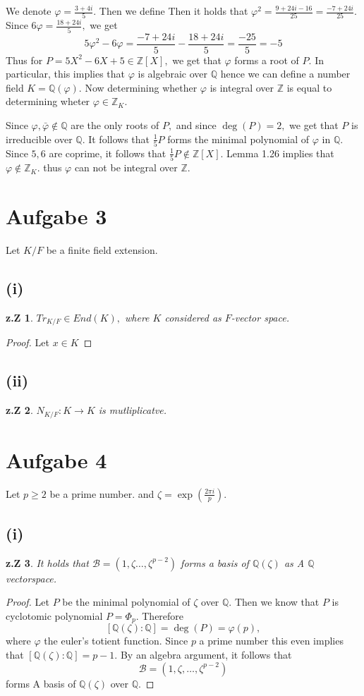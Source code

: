 \documentclass[10pt,a4paper]{article}
\newtheorem*{zz*}{z.Z}
\newcommand{\QQ}{\mathbb{Q}}
\newcommand{\ZZ}{\mathbb{Z}}
\newcommand{\frnr}{\frac{3+4i}{5}}
\begin{document}
	We denote $\varphi = \frnr.$ Then we define Then it holds that $\varphi^2 =\frac{9 + 24i - 16}{25} = \frac{-7 + 24i}{25}.$ Since $6\varphi = \frac{18+24i}{5},$ we get
	\[5\varphi^2 - 6\varphi = \frac{-7 + 24i}{5} - \frac{18+24i}{5} = \frac{-25}{5} = -5\]
	Thus for $P = 5X^2 - 6X + 5\in \ZZ[X],$ we get that $\varphi$ forms a root of $P.$ In particular, this implies that $\varphi$ is algebraic over $\QQ$ hence we can define a number field $K = \QQ(\varphi).$ Now determining whether $\varphi$ is integral over $\ZZ$ is equal to determining wheter $\varphi\in \ZZ_{K}.$
	
	Since $\varphi, \bar{\varphi}\notin \QQ$ are the only roots of $P,$ and since $\deg(P) = 2,$ we get that $P$ is irreducible over $\QQ.$ It follows that $\frac{1}{5}P$ forms the minimal polynomial of $\varphi$ in $\QQ.$ Since $5,6$ are coprime, it follows that $\frac{1}{5}P\notin \ZZ[X].$ Lemma 1.26 implies that $\varphi\notin \ZZ_{K}.$ thus $\varphi$ can not be integral over $\ZZ.$
	\pagebreak
	
	\section*{Aufgabe 3}
	Let $K/F$ be a finite field extension.
	\subsection*{(i)}
	\begin{zz*}
		$Tr_{K/F}\in End(K),$ where $K$ considered as $F$-vector space.
	\end{zz*}
	\begin{proof}
		Let $x\in K$
	\end{proof}
	\subsection*{(ii)}
	\begin{zz*}
		$N_{K/F}:K\to K$ is mutliplicatve.
	\end{zz*}
	\pagebreak
	
	\section*{Aufgabe 4}
	Let $p\geq 2$ be a prime number. and $\zeta = \exp\left(\frac{2\pi i}{p}\right).$
	\subsection*{(i)}
	\begin{zz*}
		It holds that $\mathcal{B} = (1,\zeta\dots, \zeta^{p-2})$ forms a basis of $\QQ(\zeta)$ as A $\QQ$ vectorspace.
	\end{zz*}
	\begin{proof}
		Let $P$ be the minimal polynomial of $\zeta$ over $\QQ.$ Then we know that $P$ is cyclotomic polynomial $P = \Phi_p.$ Therefore
		\[[\QQ(\zeta):\QQ] = \deg(P) = \varphi(p),\]
		where $\varphi$ the euler's totient function. Since $p$ a prime number this even implies that $[\QQ(\zeta):\QQ] = p-1.$ By an algebra argument, it follows that
		\[\mathcal{B} = (1,\zeta, \dots, \zeta^{p-2})\]
		forms A basis of $\QQ(\zeta)$ over $\QQ.$
	\end{proof}
\end{document}
